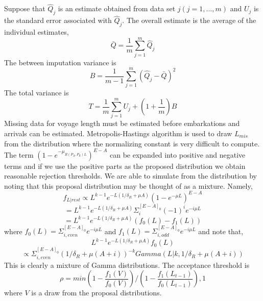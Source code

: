 \documentclass{article}
\begin{document}
Suppose that $\hat{Q}_j$ is an estimate obtained from data set $j (j=1,...,m)$ and $U_j$ is the standard error associated with $\hat{Q}_j$. The overall estimate is the average of the individual estimates,
\begin{equation}
\bar{Q}=\frac{1}{m}\sum_{j=1}^{m}\hat{Q}_j
\end{equation}
The between imputation variance is 
\begin{equation}
B=\frac{1}{m-1}\sum_{j=1}^{m}(\hat{Q}_j-\bar{Q})^2
\end{equation}
The total variance is 
\begin{equation}
T=\frac{1}{m}\sum_{j=1}^{m}U_j+(1+\frac{1}{m})B
\end{equation}
\indent
Missing data for voyage length must be estimated before embarkations and arrivals can be estimated. Metropolis-Hastings algorithm is used to draw $L_{mis}$ from the distribution where the normalizing constant is very difficult to compute. The term $(1-e^{-\mu_{R(P_A, P_E)L}})^{E-A}$ can be expanded into positive and negative terms and if we use the positive parts as the proposed distribution we obtain reasonable rejection thresholds. We are able to simulate from the distribution by noting that this proposal distribution may be thought of as a mixture. Namely,\\
\begin{equation}
f_{L|rest} \propto L^{k-1}e^{-L(1/\delta_R+\mu A)}(1-e^{-\mu L})^{E-A}
\end{equation}
\begin{equation}
=L^{k-1}e^{-L(1/\delta_R+\mu A)}\Sigma_i^{[E-A]_0}(-1)^i e^{-i\mu L}
\end{equation}
\begin{equation}
=L^{k-1}e^{-L(1/\delta_R+\mu A)}(f_0(L)-f_1(L))
\end{equation}
where $f_0(L)=\Sigma_{i, even}^{[E-A]_0} e^{-i\mu L}$ and $f_1(L)=\Sigma_{i, odd}^{[E-A]_0} e^{-i\mu L}$ and note that,
\begin{equation}
L^{k-1}e^{-L(1/\delta_R+\mu A)}f_0(L)
\end{equation}
\begin{equation}
\propto \Sigma_{i, even}^{[E-A]_0} (1/\delta_R+\mu(A+i))^{-k} Gamma(L|k, 1/\delta_R+\mu(A+i))
\end{equation}
This is clearly a mixture of Gamma distributions. The acceptance threshold is
\begin{equation}
\rho=min{(1-\frac{f_1(V)}{f_0(V)})/(1-\frac{f_1(L_{t-1})}{f_0(L_{t-1})}),1}
\end{equation}
where $V$ is a draw from the proposal distributions.\\
\end{document}
